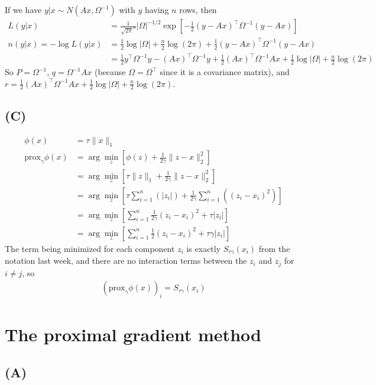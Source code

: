 \documentclass{article}
\begin{document}
If we have $ y | x \sim N(Ax, \Omega^{-1})$ with $y$ having $n$ rows, then
\begin{align*}
L(y | x)&=\frac{1}{\sqrt{2\pi}^n} |\Omega|^{-1/2} \exp\left[- \frac{1}{2}(y-Ax)^\top \Omega^{-1} (y-Ax)\right]\\
n(y|x)=-\log L(y|x)&=\frac{1}{2}\log |\Omega| +\frac{n}{2}\log(2\pi) + \frac{1}{2}(y-Ax)^\top \Omega^{-1} (y-Ax)\\
&=\frac{1}{2}y^\top \Omega^{-1} y - (Ax)^\top\Omega^{-1} y + \frac{1}{2}(Ax)^\top\Omega^{-1} Ax + \frac{1}{2}\log |\Omega| +\frac{n}{2}\log(2\pi)
\end{align*}
So $P=\Omega^{-1}$, $q=\Omega^{-1}Ax$ (because $\Omega=\Omega^\top$ since it is a covariance matrix), and $r=\frac{1}{2}(Ax)^\top\Omega^{-1} Ax + \frac{1}{2}\log |\Omega| +\frac{n}{2}\log(2\pi)$.


\subsection{(C)}
\begin{align*}
\phi(x)&=\tau \lVert x\rVert_1\\
\textrm{prox}_\gamma \phi(x)&=\arg\min_z \left[ \phi(z) + \frac{1}{2\gamma} \lVert z-x\rVert_2^2 \right]\\
&=\arg\min_z \left[ \tau \lVert z \rVert_1 + \frac{1}{2\gamma} \lVert z-x\rVert_2^2 \right]\\
&=\arg\min_z \left[ \tau \sum_{i=1}^n \left(|z_i|\right) + \frac{1}{2\gamma} \sum_{i=1}^n\left( (z_i-x_i)^2 \right) \right]\\
&=\arg\min_z \left[\sum_{i=1}^n \frac{1}{2\gamma}(z_i-x_i)^2 + \tau |z_i| \right]\\
&=\arg\min_z \left[\sum_{i=1}^n \frac{1}{2}(z_i-x_i)^2 + \tau\gamma |z_i| \right]
\end{align*}
The term being minimized for each component $z_i$ is exactly $S_{\tau\gamma}(x_i)$ from the notation last week, and
there are no interaction terms between the $z_i$ and $z_j$ for $i\neq j$, so
\begin{align*}
\left(\textrm{prox}_\gamma \phi(x)\right)_i=S_{\tau\gamma}(x_i)
\end{align*}


\section{The proximal gradient method}
\subsection{(A)}
\end{document}
